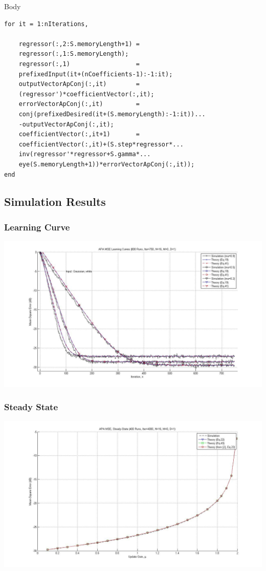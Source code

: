 \documentclass[12pt,hyperref=true,mathserif]{beamer}
\begin{document}
\begin{frame}
\begin{block}{Body}
\begin{verbatim}
for it = 1:nIterations,

    regressor(:,2:S.memoryLength+1) =
    regressor(:,1:S.memoryLength);
    regressor(:,1)                  =
    prefixedInput(it+(nCoefficients-1):-1:it);
    outputVectorApConj(:,it)        =
    (regressor')*coefficientVector(:,it);
    errorVectorApConj(:,it)         =
    conj(prefixedDesired(it+(S.memoryLength):-1:it))...
    -outputVectorApConj(:,it);
    coefficientVector(:,it+1)       =
    coefficientVector(:,it)+(S.step*regressor*...
    inv(regressor'*regressor+S.gamma*...
    eye(S.memoryLength+1))*errorVectorApConj(:,it));
end
\end{verbatim}
\end{block}
\end{frame}

\subsection{Simulation Results}
\begin{frame}
\frametitle{Learning Curve}
\includegraphics[scale=0.26]{Result001.jpg}
\end{frame}

\begin{frame}
\frametitle{Steady State}
\includegraphics[scale=0.26]{Result005.jpg}
\end{frame}
\end{document}
